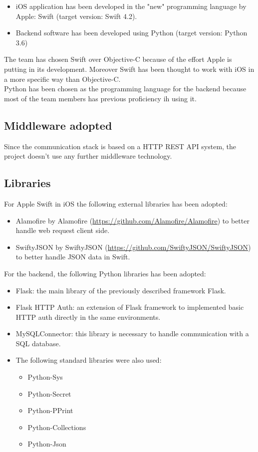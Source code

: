 \documentclass{article}
\begin{document}
\begin{itemize}
	\item iOS application has been developed in the "new" programming language by Apple: Swift (target version: Swift 4.2).
	\item  Backend software has been developed using Python (target version: Python 3.6)
\end{itemize}

The team has chosen Swift over Objective-C because of the effort Apple is putting in its development. Moreover Swift has been thought to work with iOS in a more specific way than Objective-C.\\
Python has been chosen as the programming language for the backend because most of the team members has previous proficiency ih using it.

\subsection{Middleware adopted}
Since the communication stack is based on a HTTP REST API system, the project doesn't use any further middleware technology.

\subsection{Libraries}
For Apple Swift in iOS the following external libraries has been adopted:
\begin{itemize}
	\item Alamofire by Alamofire (\url{https://github.com/Alamofire/Alamofire}) to better handle web request client side.
	\item SwiftyJSON by SwiftyJSON (\url{https://github.com/SwiftyJSON/SwiftyJSON}) to better handle JSON data in Swift.
\end{itemize}

For the backend, the following Python libraries has been adopted:
\begin{itemize}
	\item Flask: the main library of the previously described framework Flask.
	\item Flask HTTP Auth: an extension of Flask framework to implemented basic HTTP auth directly in the same environments.
	\item MySQLConnector: this library is necessary to handle communication with a SQL database.
	\item The following standard libraries were also used:
			\begin{itemize}
				\item Python-Sys
				\item Python-Secret
				\item Python-PPrint
				\item Python-Collections
				\item Python-Json
			\end{itemize}
\end{itemize}
\end{document}
